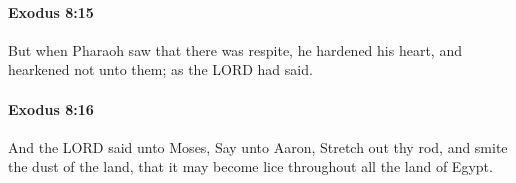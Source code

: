 		\paragraph{Exodus 8:15} %
			\label{EXODUS-8-15}

			But when Pharaoh saw that there was respite, he hardened his heart, and hearkened not unto them; as the LORD had said.


		\paragraph{Exodus 8:16} %
			\label{EXODUS-8-16}

			And the LORD said unto Moses, Say unto Aaron, Stretch out thy rod, and smite the dust of the land, that it may become lice throughout all the land of Egypt.


